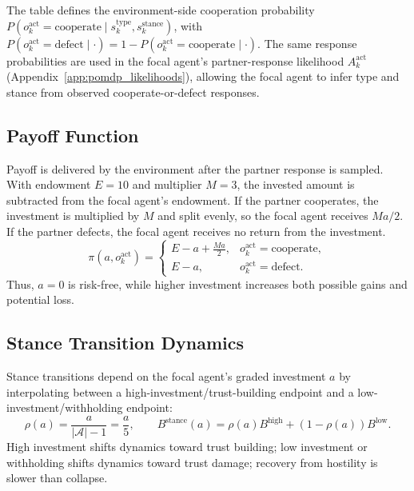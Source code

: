 \documentclass[runningheads,orivec]{llncs}
\begin{document}
The table defines the environment-side cooperation probability \(P(o^{\mathrm{act}}_k=\mathrm{cooperate}\mid s^{\mathrm{type}}_k,s^{\mathrm{stance}}_k)\), with \(P(o^{\mathrm{act}}_k=\mathrm{defect}\mid \cdot)=1-P(o^{\mathrm{act}}_k=\mathrm{cooperate}\mid \cdot)\).
The same response probabilities are used in the focal agent's partner-response likelihood \(A^{\mathrm{act}}_k\) (Appendix~\ref{app:pomdp_likelihoods}), allowing the focal agent to infer type and stance from observed cooperate-or-defect responses.

\subsection{Payoff Function}
\label{app:process_payoff}

Payoff is delivered by the environment after the partner response is sampled. With endowment \(E=10\) and multiplier \(M=3\), the invested amount is subtracted from the focal agent's endowment. If the partner cooperates, the investment is multiplied by \(M\) and split evenly, so the focal agent receives \(Ma/2\). If the partner defects, the focal agent receives no return from the investment.
\begin{equation}
\pi(a,o_k^{\mathrm{act}})=
\begin{cases}
E-a+\frac{Ma}{2}, & o_k^{\mathrm{act}}=\mathrm{cooperate},\\
E-a, & o_k^{\mathrm{act}}=\mathrm{defect}.
\end{cases}
\label{eq:graded_payoff_map}
\end{equation}
Thus, \(a=0\) is risk-free, while higher investment increases both possible gains and potential loss.

\subsection{Stance Transition Dynamics}
\label{app:process_stance}

Stance transitions depend on the focal agent's graded investment $a$ by interpolating between a high-investment/trust-building endpoint and a low-investment/withholding endpoint:
\begin{equation}
\rho(a)=\frac{a}{|\mathcal{A}|-1}=\frac{a}{5},
\qquad
B^{\mathrm{stance}}(a)=\rho(a)B^{\mathrm{high}}+(1-\rho(a))B^{\mathrm{low}}.
\label{eq:b_stance}
\end{equation}
High investment shifts dynamics toward trust building; low investment or withholding shifts dynamics toward trust damage; recovery from hostility is slower than collapse.
\end{document}
